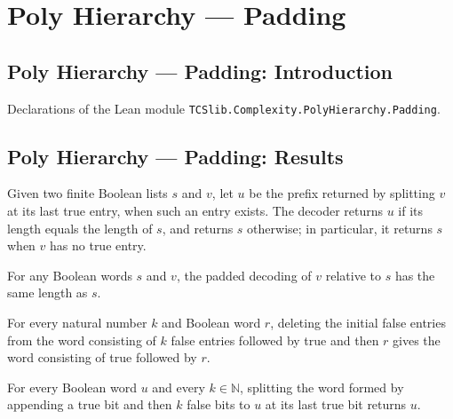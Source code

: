 \section{Poly Hierarchy --- Padding}
\subsection*{Poly Hierarchy --- Padding: Introduction}

Declarations of the Lean module \texttt{TCSlib.Complexity.PolyHierarchy.Padding}.

\subsection*{Poly Hierarchy --- Padding: Results}

\begin{definition}
\label{Complexity.PolyHierarchy.padDecode}
\leanok
{}
Given two finite Boolean lists $s$ and $v$, let $u$ be the prefix returned by splitting
$v$ at its last true entry, when such an entry exists. The decoder returns $u$ if its
length equals the length of $s$, and returns $s$ otherwise; in particular, it returns
$s$ when $v$ has no true entry.
\end{definition}

\begin{theorem}
\label{Complexity.PolyHierarchy.length_padDecode}
\leanok
{}
For any Boolean words $s$ and $v$, the padded decoding of $v$ relative to $s$ has the
same length as $s$.
\end{theorem}

\begin{theorem}
\label{Complexity.PolyHierarchy.dropWhile_replicate_false}
\leanok
{}
For every natural number $k$ and Boolean word $r$, deleting the initial false entries
from the word consisting of $k$ false entries followed by true and then $r$ gives the
word consisting of true followed by $r$.
\end{theorem}

\begin{theorem}
\label{Complexity.PolyHierarchy.splitAtLastTrue_marker}
\leanok
{}
For every Boolean word $u$ and every $k\in\mathbb N$, splitting the word formed by
appending a true bit and then $k$ false bits to $u$ at its last true bit returns $u$.
\end{theorem}

